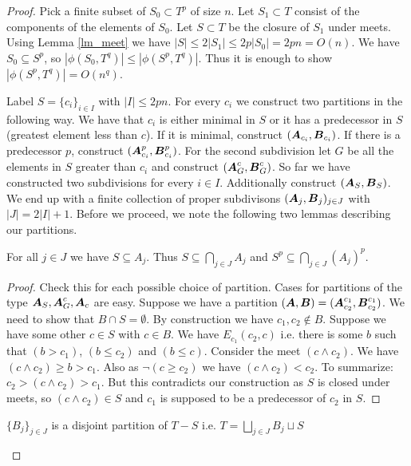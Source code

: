 \documentclass{amsart}
\DeclareMathOperator{\A}{\boldface A}
\DeclareMathOperator{\B}{\boldface B}
\begin{document}
\begin{proof}
  Pick a finite subset of $S_0 \subset T^p$ of size $n$. Let $S_1 \subset T$ consist of the components of the elements of $S_0$. Let $S \subset T$ be the closure of $S_1$ under meets. Using Lemma \ref{lm_meet} we have $|S| \leq 2|S_1| \leq 2p|S_0| = 2pn = O(n)$. We have $S_0 \subseteq S^p$, so $|\phi(S_0, T^q)| \leq |\phi(S^p, T^q)|$. Thus it is enough to show $|\phi(S^p, T^q)| = O(n^q)$.
  
  Label $S = \{c_i\}_{i \in I}$ with $|I| \leq 2pn$. For every $c_i$ we construct two partitions in the following way. We have that $c_i$ is either minimal in $S$ or it has a predecessor in $S$ (greatest element less than $c$). If it is minimal, construct $(\A_{c_i}, \B_{c_i})$. If there is a predecessor $p$, construct $(\A^p_{c_i}, \B^p_{c_i})$. For the second subdivision let $G$ be all the elements in $S$ greater than $c_i$ and construct $(\A^c_G, \B^c_G)$. So far we have constructed two subdivisions for every $i \in I$. Additionally construct $(\A_S, \B_S)$. We end up with a finite collection of proper subdivisons $(\A_j, \B_j)_{j \in J}$ with $|J| = 2|I| + 1$. Before we proceed, we note the following two lemmas describing our partitions.
  
  \begin{Lemma}
    For all $j \in J$ we have $S \subseteq A_j$. Thus $S \subseteq \bigcap_{j \in J} A_j$ and $S^p \subseteq \bigcap_{j \in J} (A_j)^p$. 
  \end{Lemma}
  
  \begin{proof}
    Check this for each possible choice of partition. Cases for partitions of the type $\A_S, \A^c_G, \A_c$ are easy. Suppose we have a partition $(\A, \B) = (\A^{c_1}_{c_2}, \B^{c_1}_{c_2})$. We need to show that $B \cap S = \emptyset$. By construction we have $c_1, c_2 \notin B$. Suppose we have some other $c \in S$ with $c \in B$. We have $E_{c_1}(c_2, c)$ i.e. there is some $b$ such that $(b > c_1)$, $(b \leq c_2)$ and $(b \leq c)$. Consider the meet $(c \wedge c_2)$. We have $(c \wedge c_2) \geq b > c_1$. Also as $\neg (c \geq c_2)$ we have $(c \wedge c_2) < c_2$. To summarize: $c_2 > (c \wedge c_2) > c_1$. But this contradicts our construction as $S$ is closed under meets, so $(c \wedge c_2) \in S$ and $c_1$ is supposed to be a predecessor of $c_2$ in $S$.
  \end{proof}
  
  \begin{Lemma}
    $\{B_j\}_{j \in J}$ is a disjoint partition of $T - S$ i.e. $T = \bigsqcup_{j \in J} B_j \sqcup S$
  \end{Lemma}
  

\end{proof}
\end{document}
